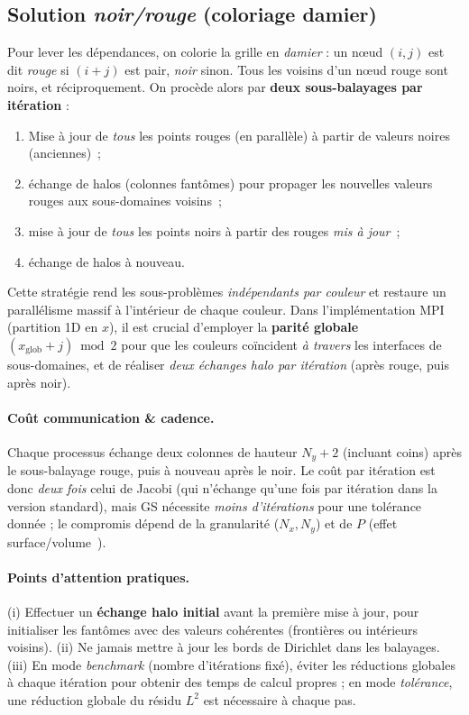 \documentclass{article}
\begin{document}
\subsection{Solution \emph{noir/rouge} (coloriage damier)}
Pour lever les dépendances, on colorie la grille en \emph{damier} : un n{\oe}ud $(i,j)$ est dit \emph{rouge} si $(i+j)$ est pair, \emph{noir} sinon. Tous les voisins d’un n{\oe}ud rouge sont noirs, et réciproquement. On procède alors par \textbf{deux sous-balayages par itération} :
\begin{enumerate}
  \item Mise à jour de \emph{tous} les points rouges (en parallèle) à partir de valeurs noires (anciennes)~;
  \item échange de halos (colonnes fantômes) pour propager les nouvelles valeurs rouges aux sous-domaines voisins~;
  \item mise à jour de \emph{tous} les points noirs à partir des rouges \emph{mis à jour}~;
  \item échange de halos à nouveau.
\end{enumerate}
Cette stratégie rend les sous-problèmes \emph{indépendants par couleur} et restaure un parallélisme massif à l’intérieur de chaque couleur. Dans l’implémentation MPI (partition 1D en $x$), il est crucial d’employer la \textbf{parité globale} $(x_{\mathrm{glob}}+j)\bmod 2$ pour que les couleurs coïncident \emph{à travers} les interfaces de sous-domaines, et de réaliser \emph{deux échanges halo par itération} (après rouge, puis après noir). \cite{gsmpi}

\paragraph{Coût communication \& cadence.} Chaque processus échange deux colonnes de hauteur $N_y{+}2$ (incluant coins) après le sous-balayage rouge, puis à nouveau après le noir. Le coût par itération est donc \emph{deux fois} celui de Jacobi (qui n’échange qu’une fois par itération dans la version standard), mais GS nécessite \emph{moins d’itérations} pour une tolérance donnée ; le compromis dépend de la granularité ($N_x,N_y$) et de $P$ (effet surface/volume~\cite{slides4}).

\paragraph{Points d’attention pratiques.} 
(i) Effectuer un \textbf{échange halo initial} avant la première mise à jour, pour initialiser les fantômes avec des valeurs cohérentes (frontières ou intérieurs voisins). 
(ii) Ne jamais mettre à jour les bords de Dirichlet dans les balayages. 
(iii) En mode \emph{benchmark} (nombre d’itérations fixé), éviter les réductions globales à chaque itération pour obtenir des temps de calcul propres ; en mode \emph{tolérance}, une réduction globale du résidu $L^2$ est nécessaire à chaque pas.
\end{document}
